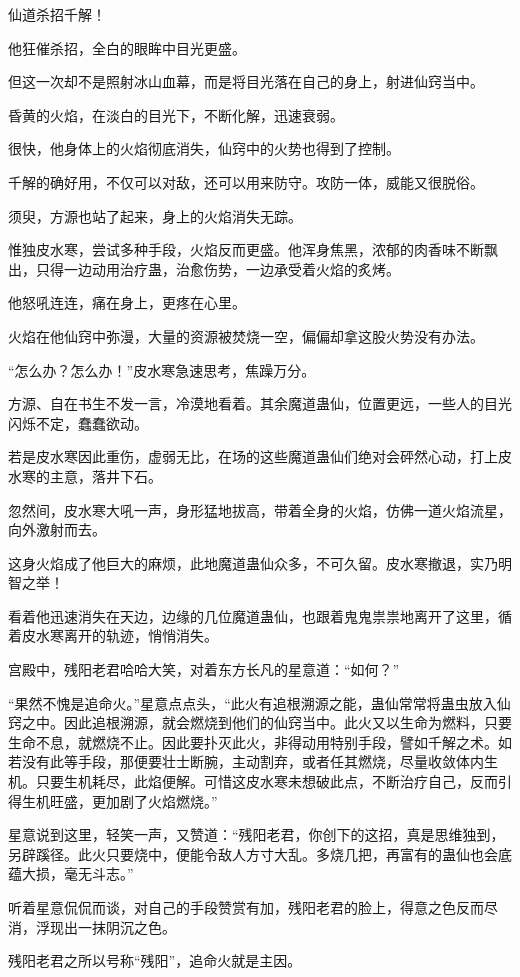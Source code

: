 \begin{this_body}
仙道杀招千解！

他狂催杀招，全白的眼眸中目光更盛。

但这一次却不是照射冰山血幕，而是将目光落在自己的身上，射进仙窍当中。

昏黄的火焰，在淡白的目光下，不断化解，迅速衰弱。

很快，他身体上的火焰彻底消失，仙窍中的火势也得到了控制。

千解的确好用，不仅可以对敌，还可以用来防守。攻防一体，威能又很脱俗。

须臾，方源也站了起来，身上的火焰消失无踪。

惟独皮水寒，尝试多种手段，火焰反而更盛。他浑身焦黑，浓郁的肉香味不断飘出，只得一边动用治疗蛊，治愈伤势，一边承受着火焰的炙烤。

他怒吼连连，痛在身上，更疼在心里。

火焰在他仙窍中弥漫，大量的资源被焚烧一空，偏偏却拿这股火势没有办法。

“怎么办？怎么办！”皮水寒急速思考，焦躁万分。

方源、自在书生不发一言，冷漠地看着。其余魔道蛊仙，位置更远，一些人的目光闪烁不定，蠢蠢欲动。

若是皮水寒因此重伤，虚弱无比，在场的这些魔道蛊仙们绝对会砰然心动，打上皮水寒的主意，落井下石。

忽然间，皮水寒大吼一声，身形猛地拔高，带着全身的火焰，仿佛一道火焰流星，向外激射而去。

这身火焰成了他巨大的麻烦，此地魔道蛊仙众多，不可久留。皮水寒撤退，实乃明智之举！

看着他迅速消失在天边，边缘的几位魔道蛊仙，也跟着鬼鬼祟祟地离开了这里，循着皮水寒离开的轨迹，悄悄消失。

宫殿中，残阳老君哈哈大笑，对着东方长凡的星意道：“如何？”

“果然不愧是追命火。”星意点点头，“此火有追根溯源之能，蛊仙常常将蛊虫放入仙窍之中。因此追根溯源，就会燃烧到他们的仙窍当中。此火又以生命为燃料，只要生命不息，就燃烧不止。因此要扑灭此火，非得动用特别手段，譬如千解之术。如若没有此等手段，那便要壮士断腕，主动割弃，或者任其燃烧，尽量收敛体内生机。只要生机耗尽，此焰便解。可惜这皮水寒未想破此点，不断治疗自己，反而引得生机旺盛，更加剧了火焰燃烧。”

星意说到这里，轻笑一声，又赞道：“残阳老君，你创下的这招，真是思维独到，另辟蹊径。此火只要烧中，便能令敌人方寸大乱。多烧几把，再富有的蛊仙也会底蕴大损，毫无斗志。”

听着星意侃侃而谈，对自己的手段赞赏有加，残阳老君的脸上，得意之色反而尽消，浮现出一抹阴沉之色。

残阳老君之所以号称“残阳”，追命火就是主因。


\end{this_body}
